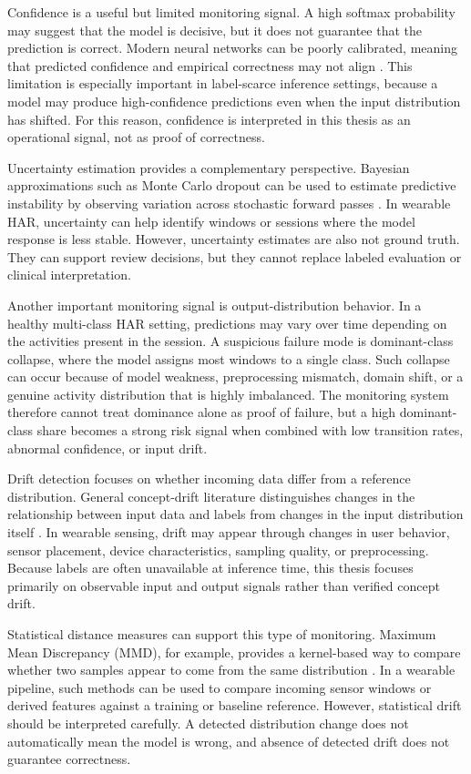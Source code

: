 Confidence is a useful but limited monitoring signal. A high softmax probability may suggest that the model is decisive, but it does not guarantee that the prediction is correct. Modern neural networks can be poorly calibrated, meaning that predicted confidence and empirical correctness may not align \cite{guo2017calibration,blasiok2024calibration}. This limitation is especially important in label-scarce inference settings, because a model may produce high-confidence predictions even when the input distribution has shifted. For this reason, confidence is interpreted in this thesis as an operational signal, not as proof of correctness.

Uncertainty estimation provides a complementary perspective. Bayesian approximations such as Monte Carlo dropout can be used to estimate predictive instability by observing variation across stochastic forward passes \cite{gal2016dropout}. In wearable HAR, uncertainty can help identify windows or sessions where the model response is less stable. However, uncertainty estimates are also not ground truth. They can support review decisions, but they cannot replace labeled evaluation or clinical interpretation.

Another important monitoring signal is output-distribution behavior. In a healthy multi-class HAR setting, predictions may vary over time depending on the activities present in the session. A suspicious failure mode is dominant-class collapse, where the model assigns most windows to a single class. Such collapse can occur because of model weakness, preprocessing mismatch, domain shift, or a genuine activity distribution that is highly imbalanced. The monitoring system therefore cannot treat dominance alone as proof of failure, but a high dominant-class share becomes a strong risk signal when combined with low transition rates, abnormal confidence, or input drift.

Drift detection focuses on whether incoming data differ from a reference distribution. General concept-drift literature distinguishes changes in the relationship between input data and labels from changes in the input distribution itself \cite{gama2014survey,webb2016characterizing}. In wearable sensing, drift may appear through changes in user behavior, sensor placement, device characteristics, sampling quality, or preprocessing. Because labels are often unavailable at inference time, this thesis focuses primarily on observable input and output signals rather than verified concept drift.

Statistical distance measures can support this type of monitoring. Maximum Mean Discrepancy (MMD), for example, provides a kernel-based way to compare whether two samples appear to come from the same distribution \cite{gretton2012kernel}. In a wearable pipeline, such methods can be used to compare incoming sensor windows or derived features against a training or baseline reference. However, statistical drift should be interpreted carefully. A detected distribution change does not automatically mean the model is wrong, and absence of detected drift does not guarantee correctness.


